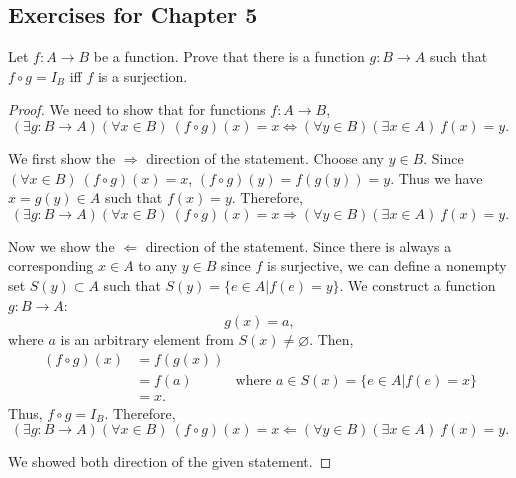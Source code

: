\documentclass[../main.tex]{subfiles}
\begin{document}
\subsection{Exercises for Chapter 5}
\begin{exercise}
    Let $f: A \rightarrow B$ be a function.
    Prove that there is a function $g: B \rightarrow A$ such that $f \circ g = I_B$ iff $f$ is a surjection.
\end{exercise}
\begin{proof}
    We need to show that for functions $f: A \rightarrow B$,
    \[
        (\exists g: B \rightarrow A) (\forall x \in B)\ (f \circ g)(x) = x \Leftrightarrow (\forall y \in B)(\exists x \in A)\ f(x) = y.
    \]

    We first show the $\Rightarrow$ direction of the statement.
    Choose any $y \in B$. 
    Since $(\forall x \in B)\ (f \circ g)(x) = x$, $(f \circ g)(y) = f(g(y)) = y$.
    Thus we have $x = g(y) \in A$ such that $f(x) = y$.
    Therefore, 
    \[
        (\exists g: B \rightarrow A) (\forall x \in B)\ (f \circ g)(x) = x \Rightarrow (\forall y \in B)(\exists x \in A)\ f(x) = y.
    \]

    Now we show the $\Leftarrow$ direction of the statement.
    Since there is always a corresponding $x \in A$ to any $y \in B$ since $f$ is surjective, we can define a nonempty set $S(y) \subset A$ such that $S(y) = \{e \in A | f(e) = y\}$.
    We construct a function $g: B \rightarrow A$:
    \[
        g(x) = a,
    \]
    where $a$ is an arbitrary element from $S(x) \neq \varnothing$.
    Then,
    \begin{align*}
        (f \circ g)(x) &= f(g(x))\\
                       &= f(a) &\text{where $a \in S(x) = \{e \in A | f(e) = x\}$}\\
                       &= x.
    \end{align*}
    Thus, $f\circ g = I_B$.
    Therefore,
    \[
        (\exists g: B \rightarrow A) (\forall x \in B)\ (f \circ g)(x) = x \Leftarrow (\forall y \in B)(\exists x \in A)\ f(x) = y.
    \]

    We showed both direction of the given statement.
\end{proof}
\end{document}
